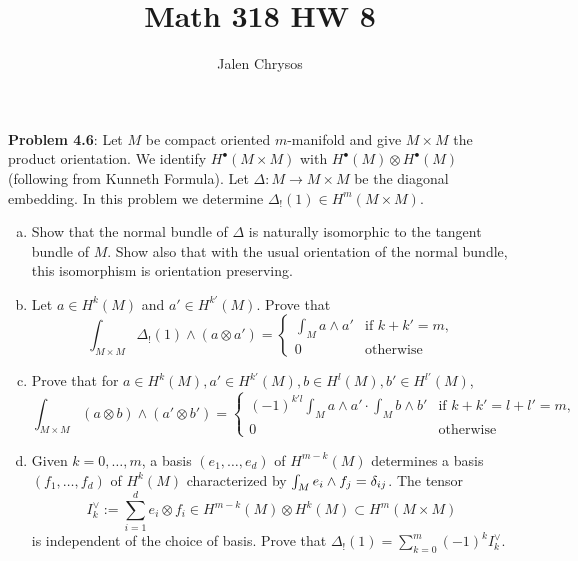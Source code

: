 \documentclass{amsart}
\title{Math 318 HW 8}
\author{Jalen Chrysos}
\begin{document}
	
	\maketitle
	
	\textbf{Problem 4.6}: Let $M$ be compact oriented $m$-manifold and give $M\times M$ the product orientation. We identify $H^{\bullet}(M\times M)$ with $H^{\bullet}(M)\otimes H^{\bullet}(M)$ (following from Kunneth Formula). Let $\Delta:M\to M\times M$ be the diagonal embedding. In this problem we determine $\Delta_!(1)\in H^m(M\times M)$.
	\begin{enumerate}[(a)]
		\item Show that the normal bundle of $\Delta$ is naturally isomorphic to the tangent bundle of $M$. Show also that with the usual orientation of the normal bundle, this isomorphism is orientation preserving.
		\item Let $a\in H^k(M)$ and $a'\in H^{k'}(M)$. Prove that 
		$$
		\int_{M\times M} \Delta_!(1)\wedge (a\otimes a') = \begin{cases}
			\int_M a\wedge a' & \text{if } k+k'=m,\\
			0 & \text{otherwise}
		\end{cases}
		$$
		\item Prove that for $a\in H^k(M), a'\in H^{k'}(M), b\in H^l(M), b'\in H^{l'}(M)$, 
		$$
		\int_{M\times M} (a\otimes b)\wedge (a'\otimes b') = \begin{cases}
			(-1)^{k'l} \int_Ma\wedge a' \cdot \int_M b\wedge b' & \text{if }k+k' = l+l'=m,\\
			0 & \text{otherwise}
		\end{cases}
		$$
		\item Given $k=0,\dots,m$, a basis $(e_1,\dots,e_d)$ of $H^{m-k}(M)$ determines a basis $(f_1,\dots,f_d)$ of $H^k(M)$ characterized by $\int_M e_i\wedge f_j=\delta_{ij}$. The tensor 
		$$
		I_k^{\vee} := \sum_{i=1}^d e_i\otimes f_i \in H^{m-k}(M)\otimes H^k(M) \subset H^m(M\times M)
		$$
		is independent of the choice of basis. Prove that $\Delta_!(1)=\sum_{k=0}^m (-1)^k I_k^{\vee}$.
	\end{enumerate}
	
\end{document}
